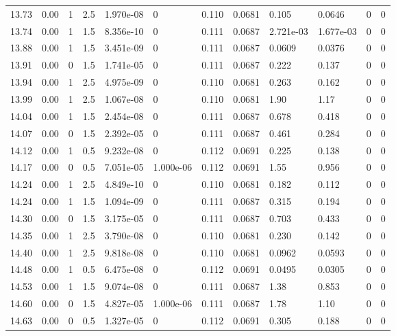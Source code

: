 \documentclass[preview]{standalone}
\begin{document}
{{{{{{{{\begin{tabular}{L{1.2cm}C{1.2cm} C{0.3cm}C{0.5cm} C{1.4cm}C{1.4cm} C{1.4cm}C{1.4cm} C{1.6cm}C{1.6cm} C{1.6cm}C{1.6cm}}
  13.73  &  0.00  & 1     & 2.5 &  1.970e-08  & 0  &  0.110&   0.0681& 0.105 & 0.0646   &  0 & 0  \\ 
  13.74  &  0.00  & 1     & 1.5 &  8.356e-10  & 0  &  0.111&   0.0687& 2.721e-03 & 1.677e-03   &  0 & 0  \\ 
  13.88  &  0.00  & 1     & 1.5 &  3.451e-09  & 0  &  0.111&   0.0687& 0.0609 & 0.0376   &  0 & 0  \\ 
  13.91  &  0.00  & 0     & 1.5 &  1.741e-05  & 0  &  0.111&   0.0687& 0.222 & 0.137   &  0 & 0  \\ 
  13.94  &  0.00  & 1     & 2.5 &  4.975e-09  & 0  &  0.110&   0.0681& 0.263 & 0.162   &  0 & 0  \\ 
  13.99  &  0.00  & 1     & 2.5 &  1.067e-08  & 0  &  0.110&   0.0681& 1.90 & 1.17   &  0 & 0  \\ 
  14.04  &  0.00  & 1     & 1.5 &  2.454e-08  & 0  &  0.111&   0.0687& 0.678 & 0.418   &  0 & 0  \\ 
  14.07  &  0.00  & 0     & 1.5 &  2.392e-05  & 0  &  0.111&   0.0687& 0.461 & 0.284   &  0 & 0  \\ 
  14.12  &  0.00  & 1     & 0.5 &  9.232e-08  & 0  &  0.112&   0.0691& 0.225 & 0.138   &  0 & 0  \\ 
  14.17  &  0.00  & 0     & 0.5 &  7.051e-05  & 1.000e-06  &  0.112&   0.0691& 1.55 & 0.956   &  0 & 0  \\ 
  14.24  &  0.00  & 1     & 2.5 &  4.849e-10  & 0  &  0.110&   0.0681& 0.182 & 0.112   &  0 & 0  \\ 
  14.24  &  0.00  & 1     & 1.5 &  1.094e-09  & 0  &  0.111&   0.0687& 0.315 & 0.194   &  0 & 0  \\ 
  14.30  &  0.00  & 0     & 1.5 &  3.175e-05  & 0  &  0.111&   0.0687& 0.703 & 0.433   &  0 & 0  \\ 
  14.35  &  0.00  & 1     & 2.5 &  3.790e-08  & 0  &  0.110&   0.0681& 0.230 & 0.142   &  0 & 0  \\ 
  14.40  &  0.00  & 1     & 2.5 &  9.818e-08  & 0  &  0.110&   0.0681& 0.0962 & 0.0593   &  0 & 0  \\ 
  14.48  &  0.00  & 1     & 0.5 &  6.475e-08  & 0  &  0.112&   0.0691& 0.0495 & 0.0305   &  0 & 0  \\ 
  14.53  &  0.00  & 1     & 1.5 &  9.074e-08  & 0  &  0.111&   0.0687& 1.38 & 0.853   &  0 & 0  \\ 
  14.60  &  0.00  & 0     & 1.5 &  4.827e-05  & 1.000e-06  &  0.111&   0.0687& 1.78 & 1.10   &  0 & 0  \\ 
  14.63  &  0.00  & 0     & 0.5 &  1.327e-05  & 0  &  0.112&   0.0691& 0.305 & 0.188   &  0 & 0  \\ 

\end{tabular}}}}}}}}}
\end{document}
